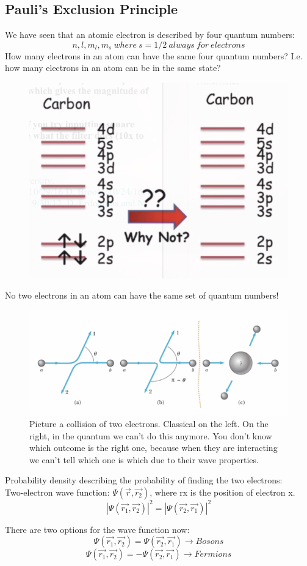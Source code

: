 \documentclass[class=article,crop=false]{standalone}
\begin{document}
\subsection{Pauli's Exclusion Principle}
We have seen that an atomic electron is described by four quantum numbers:
$$ n, l, m_l, m_s\ where\ s = 1/2\ always\ for\ electrons $$
How many electrons in an atom can have the same four quantum numbers? I.e. how many electrons in an atom can be in the same state?
\begin{figure}[h!]
	\centering
	\includegraphics[width=.25\linewidth]{./Images/carbon_electrons.png}
	\caption{}
\end{figure}

\begin{result}
	No two electrons in an atom can have the same set of quantum numbers!
\end{result}

\begin{figure}[h!]
	\centering
	\includegraphics[width=.8\linewidth]{./Images/collision.png}
	\caption{Picture a collision of two electrons. Classical on the left. On the right, in the quantum we can't do this anymore. You don't know which outcome is the right one, because when they are interacting we can't tell which one is which due to their wave properties.}
\end{figure}

Probability density describing the probability of finding the two electrons: \\
Two-electron wave function: $ \Psi(\vec{r}, \vec{r_2}) $, where rx is the position of electron x.
$$ |\Psi(\vec{r_1}, \vec{r_2})|^2 = |\Psi(\vec{r_2}, \vec{r_1})|^2 $$

There are two options for the wave function now:
$$ \Psi(\vec{r_1}, \vec{r_2}) = \Psi(\vec{r_2}, \vec{r_1}) \rightarrow Bosons $$
$$ \Psi(\vec{r_1}, \vec{r_2}) = -\Psi(\vec{r_2}, \vec{r_1}) \rightarrow Fermions $$
\end{document}
